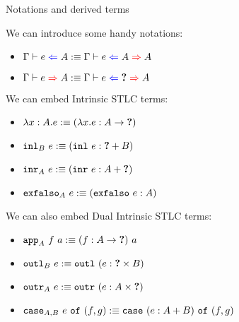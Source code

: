 \documentclass{beamer}
\newcommand{\Fun}[2]{#1 \to #2}
\newcommand{\Prod}[2]{#1 \times #2}
\newcommand{\Sum}[2]{#1 + #2}
\newcommand{\annot}[2]{(#1 : #2)}
\newcommand{\fun}[2]{\lambda #1. #2}
\newcommand{\app}[2]{#1\ #2}
\newcommand{\outl}[1]{\texttt{outl}\ #1}
\newcommand{\outr}[1]{\texttt{outr}\ #1}
\newcommand{\inl}[1]{\texttt{inl}\ #1}
\newcommand{\inr}[1]{\texttt{inr}\ #1}
\newcommand{\case}[3]{\texttt{case}\ #1\ \texttt{of}\ (#2, #3)}
\newcommand{\exfalso}[1]{\texttt{exfalso}\ #1}
\begin{document}
\begin{frame}{Notations and derived terms}

We can introduce some handy notations:

\begin{itemize}
  \item $\check{e}{A} :\equiv \hinting{e}{A}{A}$
  \item $\infer{e}{A} :\equiv \hinting{e}{\Hole}{A}$
\end{itemize}

We can embed Intrinsic STLC terms:

\begin{itemize}
  \item $\ifun{x}{A}{e} :\equiv \annot{\fun{x}{e}}{\Fun{A}{\Hole}}$ \\
  \item $\iinl{B}{e} :\equiv \annot{\inl{e}}{\Sum{\Hole}{B}}$ \\
  \item $\iinr{A}{e} :\equiv \annot{\inr{e}}{\Sum{A}{\Hole}}$ \\
  \item $\iexfalso{A}{e} :\equiv \annot{\exfalso{e}}{A}$
\end{itemize}

We can also embed Dual Intrinsic STLC terms:

\begin{itemize}
  \item $\iapp{A}{f}{a} :\equiv \app{\annot{f}{\Fun{A}{\Hole}}}{a}$
  \item $\ioutl{B}{e} :\equiv \outl{\annot{e}{\Prod{\Hole}{B}}}$
  \item $\ioutr{A}{e} :\equiv \outr{\annot{e}{\Prod{A}{\Hole}}}$
  \item $\icase{A}{B}{e}{f}{g} :\equiv \case{\annot{e}{\Sum{A}{B}}}{f}{g}$
\end{itemize}

\end{frame}
\end{document}
